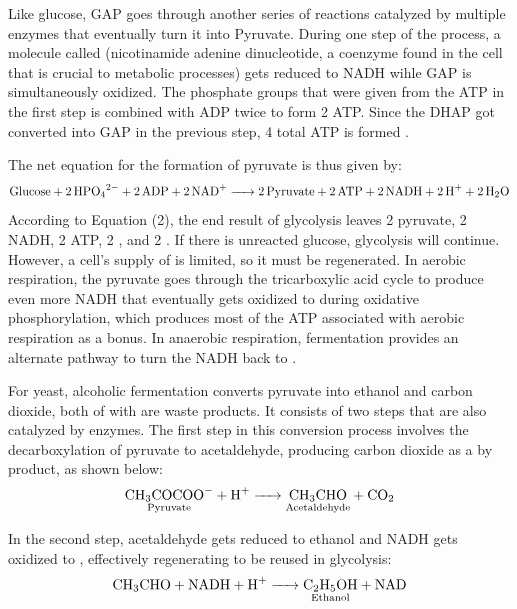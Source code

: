 \documentclass{article}
\begin{document}
\medskip

Like glucose, GAP goes through another series of reactions catalyzed by multiple enzymes that eventually turn it into Pyruvate. During one step of the process, a molecule called  (nicotinamide adenine dinucleotide, a coenzyme found in the cell that is crucial to metabolic processes) \parencite{ref} gets reduced to NADH wihle GAP is simultaneously oxidized. The phosphate groups that were given from the ATP in the first step is combined with ADP twice to form 2 ATP. Since the DHAP got converted into GAP in the previous step, 4 total ATP is formed \parencite{ref}.

\medskip

The net equation for the formation of pyruvate is thus given by:
\begin{equation}
    \ce{Glucose + 2HPO_{4}^{2-} + 2ADP + 2NAD+ -> 2Pyruvate + 2ATP + 2 NADH + 2H+ + 2H2O}
\end{equation} %
According to Equation (2), the end result of glycolysis leaves 2 pyruvate, 2 NADH, 2 ATP, 2 , and 2 . If there is unreacted glucose, glycolysis will continue. However, a cell's supply of  is limited, so it must be regenerated. In aerobic respiration, the pyruvate goes through the tricarboxylic acid cycle to produce even more NADH that eventually gets oxidized to  during oxidative phosphorylation, which produces most of the ATP associated with aerobic respiration as a bonus. In anaerobic respiration, fermentation provides an alternate pathway to turn the NADH back to .

\medskip

For yeast,  alcoholic fermentation converts pyruvate into ethanol and carbon dioxide, both of with are waste products. It consists of two steps that are also catalyzed by enzymes. The first step in this conversion process involves the decarboxylation of pyruvate to acetaldehyde, producing carbon dioxide as a by product, as shown below:
\begin{equation}
    \ce{\underset{\text{Pyruvate}}{\ce{CH3COCOO-}} + H+ -> \underset{\text{Acetaldehyde}}{\ce{CH3CHO}} + CO2}
\end{equation}

In the second step, acetaldehyde gets reduced to ethanol and NADH gets oxidized to , effectively regenerating  to be reused in glycolysis:
\begin{equation}
    \ce{CH3CHO + NADH + H+ -> \underset{\text{Ethanol}}{\ce{C2H5OH}} + NAD}
\end{equation}
\end{document}
